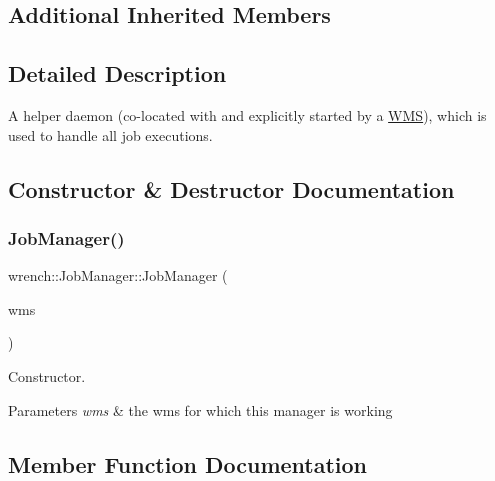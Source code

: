 \subsection*{Additional Inherited Members}


\subsection{Detailed Description}
A helper daemon (co-\/located with and explicitly started by a \hyperlink{classwrench_1_1_w_m_s}{W\+MS}), which is used to handle all job executions. 

\subsection{Constructor \& Destructor Documentation}
\mbox{\label{classwrench_1_1_job_manager_a2b1797c3648c8a7a9418d8720c64e177}} 
\subsubsection{\texorpdfstring{Job\+Manager()}{JobManager()}}
{\footnotesize\ttfamily wrench\+::\+Job\+Manager\+::\+Job\+Manager (\begin{DoxyParamCaption}\item[{\hyperlink{classwrench_1_1_w_m_s}{W\+MS} $\ast$}]{wms }\end{DoxyParamCaption})\hspace{0.3cm}{\ttfamily [protected]}}



Constructor. 


\begin{DoxyParams}{Parameters}
{\em wms} & the wms for which this manager is working \\
\hline
\end{DoxyParams}


\subsection{Member Function Documentation}
\mbox{\label{classwrench_1_1_job_manager_a9ef786306730359866e3fd2bd3aadaf7}} 
